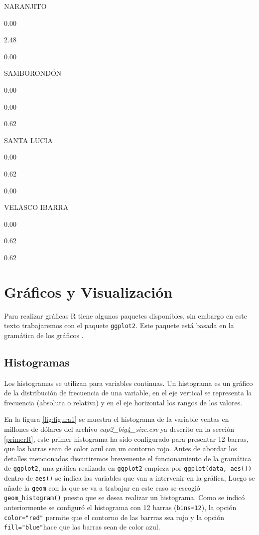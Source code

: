 \documentclass[]{book}
\begin{document}
NARANJITO

0.00

2.48

0.00

SAMBORONDÓN

0.00

0.00

0.62

SANTA LUCIA

0.00

0.62

0.00

VELASCO IBARRA

0.00

0.62

0.62

\section{Gráficos y Visualización}\label{graficos-y-visualizacion}

Para realizar gráficas R tiene algunos paquetes disponibles, sin embargo
en este texto trabajaremos con el paquete \texttt{ggplot2}. Este paquete
está basada en la gramática de los gráficos \citep{wilkinson2005}.

\subsection{Histogramas}\label{histogramas}

Los histogramas se utilizan para variables continuas. Un histograma es
un gráfico de la distribución de frecuencia de una variable, en el eje
vertical se representa la frecuencia (absoluta o relativa) y en el eje
horizontal los rangos de los valores.

En la figura \ref{fig:figura1} se muestra el histograma de la variable
ventas en millones de dólares del archivo \emph{cap2\_big4\_size.csv} ya
descrito en la sección \ref{primerR}, este primer histograma ha sido
configurado para presentar 12 barras, que las barras sean de color azul
con un contorno rojo. Antes de abordar los detalles mencionados
discutiremos brevemente el funcionamiento de la gramática de
\texttt{ggplot2}, una gráfica realizada en \texttt{ggplot2} empieza por
\texttt{ggplot(data,\ aes())} dentro de \texttt{aes()} se indica las
variables que van a intervenir en la gráfica, Luego se añade la
\texttt{geom} con la que se va a trabajar en este caso se escogió
\texttt{geom\_histogram()} puesto que se desea realizar un histograma.
Como se indicó anteriormente se configuró el histograma con 12 barras
(\texttt{bins=12}), la opción \texttt{color="red"} permite que el
contorno de las barrras sea rojo y la opción \texttt{fill="blue"}hace
que las barras sean de color azul.
\end{document}

